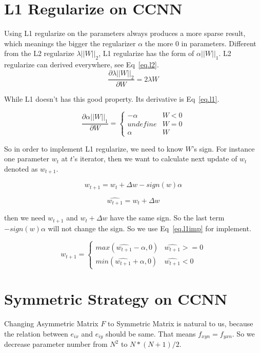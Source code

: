 \documentclass[12pt]{article}
\begin{document}
\section{L1 Regularize on CCNN}
Using L1 regularize on the parameters always produces a more sparse result, which meanings the bigger the regularizer $\alpha$ the more 0 in parameters. Different from the L2 regularize $\lambda || W ||_2$, L1 regularize has the form of $\alpha || W ||_1$. L2 regularize can derived everywhere, see Eq~\ref{eq.l2}.
\begin{equation}
\frac{\partial{\lambda || W ||_2}}{\partial W} = 2 \lambda W \label{eq.l2}
\end{equation}

While L1 doesn't has this good property. Its derivative is Eq~\ref{eq.l1}.

\begin{equation}
\frac{\partial{\alpha || W ||_1}}{\partial W} = \left \{
\begin{array}{ll}
-\alpha & W<0 \\
undefine & W=0 \\
\alpha & W
\end{array} \right . \label{eq.l1}
\end{equation}

So in order to implement L1 regularize, we need to know $W$'s sign. For instance one parameter $w_t$ at $t$'s iterator, then we want to calculate next update of $w_t$ denoted as $w_{t+1}$.

\begin{equation}
w_{t+1} = w_t + \Delta w - sign(w) \alpha
\end{equation}

\begin{equation}
\hat{w_{t+1}} = w_t + \Delta w
\end{equation}

then we need $w_{t+1}$ and $w_t + \Delta w$ have the same sign. So the last term $-sign(w) \alpha$ will not change the sign. So we use Eq~\ref{eq.l1imp} for implement.

\begin{equation}
w_{t+1} = \left \{
\begin{array}{ll}
max(\hat{w_{t+1}}-\alpha, 0) & \hat{w_{t+1}}>=0 \\
min(\hat{w_{t+1}}+\alpha, 0) & \hat{w_{t+1}}<0
\end{array}
\right .
\label{eq.l1imp}
\end{equation}

\section{Symmetric Strategy on CCNN}
Changing Asymmetric Matrix $F$ to Symmetric Matrix is natural to us, because the relation between $e_{ix}$ and $e_{iy}$ should be same. That means $f_{xyn}=f_{yxn}$. So we decrease parameter number from $N^2$ to $N*(N+1)/2$.
\end{document}

